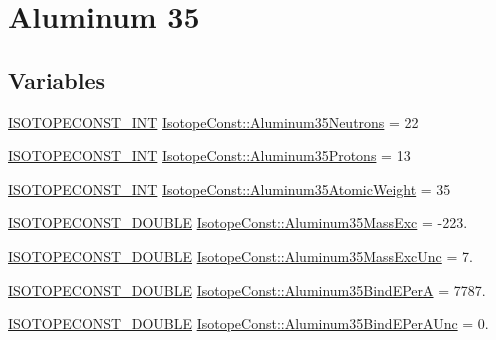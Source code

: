 \hypertarget{group___isotope_const-_aluminum-_al35}{}\section{Aluminum 35}
\label{group___isotope_const-_aluminum-_al35}
\subsection*{Variables}
\begin{DoxyCompactItemize}
\item 
\mbox{\hyperlink{group___isotope_const-_macros_ga5f18360b3e99483a35c32d789e62621c}{I\+S\+O\+T\+O\+P\+E\+C\+O\+N\+S\+T\+\_\+\+I\+NT}} \mbox{\hyperlink{group___isotope_const-_aluminum-_al35_ga517cc0da85708f6dd6776a9dcfbcdf18}{Isotope\+Const\+::\+Aluminum35\+Neutrons}} = 22
\item 
\mbox{\hyperlink{group___isotope_const-_macros_ga5f18360b3e99483a35c32d789e62621c}{I\+S\+O\+T\+O\+P\+E\+C\+O\+N\+S\+T\+\_\+\+I\+NT}} \mbox{\hyperlink{group___isotope_const-_aluminum-_al35_gafae8e675176b3cc5ab8691021e92d017}{Isotope\+Const\+::\+Aluminum35\+Protons}} = 13
\item 
\mbox{\hyperlink{group___isotope_const-_macros_ga5f18360b3e99483a35c32d789e62621c}{I\+S\+O\+T\+O\+P\+E\+C\+O\+N\+S\+T\+\_\+\+I\+NT}} \mbox{\hyperlink{group___isotope_const-_aluminum-_al35_gac951cd1d9c5f2244eb52dd2aba213220}{Isotope\+Const\+::\+Aluminum35\+Atomic\+Weight}} = 35
\item 
\mbox{\hyperlink{group___isotope_const-_macros_ga8f45a7272ce02c0b4c65c44636ed719a}{I\+S\+O\+T\+O\+P\+E\+C\+O\+N\+S\+T\+\_\+\+D\+O\+U\+B\+LE}} \mbox{\hyperlink{group___isotope_const-_aluminum-_al35_ga9a46f913645add43eef43ad8115b4829}{Isotope\+Const\+::\+Aluminum35\+Mass\+Exc}} = -\/223.
\item 
\mbox{\hyperlink{group___isotope_const-_macros_ga8f45a7272ce02c0b4c65c44636ed719a}{I\+S\+O\+T\+O\+P\+E\+C\+O\+N\+S\+T\+\_\+\+D\+O\+U\+B\+LE}} \mbox{\hyperlink{group___isotope_const-_aluminum-_al35_ga70171b6b50c949bcb4bf10e3c64fc122}{Isotope\+Const\+::\+Aluminum35\+Mass\+Exc\+Unc}} = 7.
\item 
\mbox{\hyperlink{group___isotope_const-_macros_ga8f45a7272ce02c0b4c65c44636ed719a}{I\+S\+O\+T\+O\+P\+E\+C\+O\+N\+S\+T\+\_\+\+D\+O\+U\+B\+LE}} \mbox{\hyperlink{group___isotope_const-_aluminum-_al35_ga5784851be6baf1daf766af8f6c1653a8}{Isotope\+Const\+::\+Aluminum35\+Bind\+E\+PerA}} = 7787.
\item 
\mbox{\hyperlink{group___isotope_const-_macros_ga8f45a7272ce02c0b4c65c44636ed719a}{I\+S\+O\+T\+O\+P\+E\+C\+O\+N\+S\+T\+\_\+\+D\+O\+U\+B\+LE}} \mbox{\hyperlink{group___isotope_const-_aluminum-_al35_ga6d21d642c62a083998578ccaf2719c17}{Isotope\+Const\+::\+Aluminum35\+Bind\+E\+Per\+A\+Unc}} = 0.

\end{DoxyCompactItemize}
